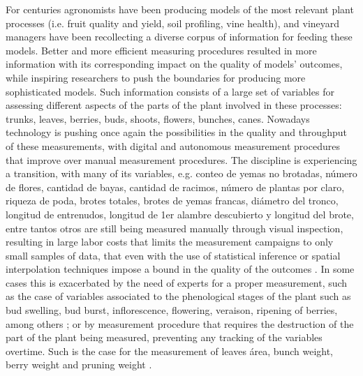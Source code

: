 \documentclass[a4paper,authoryear,review]{elsarticle}
\begin{document}
	For centuries agronomists have been producing models of the most relevant plant processes (i.e. fruit quality and yield, soil profiling, vine health), and vineyard managers have been recollecting a diverse corpus of information for feeding these models. Better and more efficient measuring procedures resulted in more information with its corresponding impact on the quality of models’ outcomes, while inspiring researchers to push the boundaries for producing more sophisticated models. Such information consists of a large set of variables for assessing different aspects of the parts of the plant involved in these processes: trunks, leaves, berries, buds, shoots, flowers, bunches, canes. 
	Nowadays technology is pushing once again the possibilities in the quality and throughput of these measurements, with digital and autonomous measurement procedures that improve over manual measurement procedures. The discipline is experiencing a transition, with many of its variables, e.g. conteo de yemas no brotadas, número de flores, cantidad de bayas, cantidad de racimos, número de plantas por claro, riqueza de poda, brotes totales, brotes de yemas francas, diámetro del tronco, longitud de entrenudos, longitud de 1er alambre descubierto y longitud del brote, entre tantos otros  \citep{pellegrino2005towards, intrigliolo2007evaluation, reynolds2009influence, matese2015technology, ozdemir2017precision, poni2018grapevine} are still being measured manually through visual inspection, resulting in large labor costs that limits the measurement campaigns to only small samples of data, that even with the use of statistical inference or spatial interpolation techniques impose a bound in the quality of the outcomes \citep{whelan1996spatial, borgogno2018comparison, taylor2019considerations}. 
	In some cases this is exacerbated by the need of experts for a proper measurement, such as the case of variables associated to the phenological stages of the plant such as bud swelling, bud burst, inflorescence, flowering, veraison, ripening of berries, among others \citep{lorenz1995growth}; or by measurement procedure that requires the destruction of the part of the plant being measured, preventing any tracking of the variables overtime. Such is the case for the measurement of leaves área, bunch weight, berry weight and pruning weight \citep{kliewer2005leaf}. 
	
\end{document}
